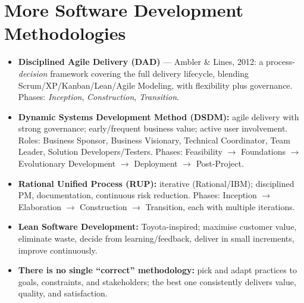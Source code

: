 \documentclass[hidelinks]{article}
\begin{document}
\section{More Software Development Methodologies}
\begin{itemize}
  \item \textbf{Disciplined Agile Delivery (DAD)} --- Ambler \& Lines, 2012: a process-\emph{decision}
        framework covering the full delivery lifecycle, blending Scrum/XP/Kanban/Lean/Agile
        Modeling, with flexibility plus governance. Phases: \emph{Inception}, \emph{Construction},
        \emph{Transition}.
  \item \textbf{Dynamic Systems Development Method (DSDM):} agile delivery with strong governance;
        early/frequent business value; active user involvement. Roles: Business Sponsor, Business
        Visionary, Technical Coordinator, Team Leader, Solution Developers/Testers. Phases:
        Feasibility $\to$ Foundations $\to$ Evolutionary Development $\to$ Deployment $\to$
        Post-Project.
  \item \textbf{Rational Unified Process (RUP):} iterative (Rational/IBM); disciplined PM,
        documentation, continuous risk reduction. Phases: Inception $\to$ Elaboration $\to$
        Construction $\to$ Transition, each with multiple iterations.
  \item \textbf{Lean Software Development:} Toyota-inspired; maximise customer value, eliminate
        waste, decide from learning/feedback, deliver in small increments, improve continuously.
  \item \textbf{There is no single ``correct'' methodology:} pick and adapt practices to goals,
        constraints, and stakeholders; the best one consistently delivers value, quality, and
        satisfaction.
\end{itemize}
\end{document}
